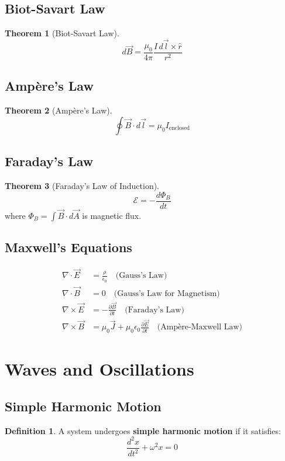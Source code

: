 \documentclass[11pt]{article}
\theoremstyle{definition}
\newtheorem{definition}{Definition}[section]
\newtheorem{theorem}{Theorem}[section]
\begin{document}
\subsection{Biot-Savart Law}
\begin{theorem}[Biot-Savart Law]
$$d\vec{B} = \frac{\mu_0}{4\pi} \frac{I \, d\vec{l} \times \hat{r}}{r^2}$$
\end{theorem}

\subsection{Ampère's Law}
\begin{theorem}[Ampère's Law]
$$\oint \vec{B} \cdot d\vec{l} = \mu_0 I_{\text{enclosed}}$$
\end{theorem}

\subsection{Faraday's Law}
\begin{theorem}[Faraday's Law of Induction]
$$\mathcal{E} = -\frac{d\Phi_B}{dt}$$
where $\Phi_B = \int \vec{B} \cdot d\vec{A}$ is magnetic flux.
\end{theorem}

\subsection{Maxwell's Equations}
\begin{align}
    \nabla \cdot \vec{E} &= \frac{\rho}{\epsilon_0} \quad \text{(Gauss's Law)} \\
    \nabla \cdot \vec{B} &= 0 \quad \text{(Gauss's Law for Magnetism)} \\
    \nabla \times \vec{E} &= -\frac{\partial \vec{B}}{\partial t} \quad \text{(Faraday's Law)} \\
    \nabla \times \vec{B} &= \mu_0 \vec{J} + \mu_0 \epsilon_0 \frac{\partial \vec{E}}{\partial t} \quad \text{(Ampère-Maxwell Law)}
\end{align}

\section{Waves and Oscillations}

\subsection{Simple Harmonic Motion}
\begin{definition}
A system undergoes \textbf{simple harmonic motion} if it satisfies:
$$\frac{d^2 x}{dt^2} + \omega^2 x = 0$$
\end{definition}
\end{document}
